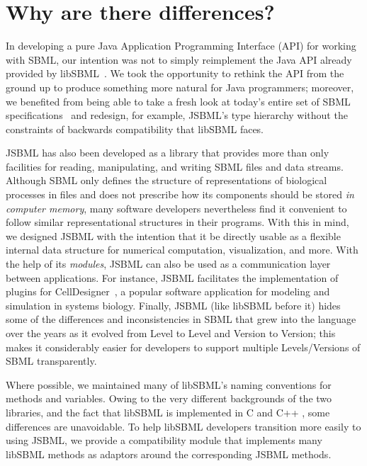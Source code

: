 
\section{Why are there differences?}
\label{sec:jsbml-design-goals}

In developing a pure Java Application Programming Interface (API) for
working with SBML, our intention was not to simply reimplement the Java API
already provided by libSBML~\citep{Bornstein2008}.
We took the opportunity to rethink the API
 from the ground up to
produce something more natural for Java programmers; moreover, we
benefited from being able to take a fresh look at today's entire set of
SBML specifications~\citep{Hucka2003, Hucka2008, Hucka2010a}
 and redesign, for example, JSBML's type
hierarchy without the constraints of backwards compatibility that libSBML
faces. 

JSBML has also been developed as a library that provides more than only
facilities for reading, manipulating, and writing SBML files and data
streams. Although SBML only defines the structure of representations of
biological processes in files and does not prescribe how its components
should be stored \emph{in computer memory}, many software developers
nevertheless find it convenient to follow similar representational
structures in their programs.  With this
in mind, we designed JSBML with the intention that it be directly usable as
a flexible internal data structure for numerical computation,
visualization, and more. With the help of its \emph{modules}, JSBML can
also be used as a communication layer between applications. For instance,
JSBML facilitates the implementation of plugins for
CellDesigner~\citep{Funahashi2003},  a popular software
application for modeling and simulation in systems biology. Finally, JSBML
(like libSBML before it) hides some of the differences and inconsistencies
in SBML  that grew into the language
over the years as it evolved from Level to Level and Version to Version;
this makes it considerably easier for developers to support multiple
Levels/Versions of SBML transparently.

Where possible, we maintained many of libSBML's naming conventions for
methods and variables. Owing to the very different backgrounds of the two
libraries, and the fact that libSBML is implemented in C  and
C++ , some differences are unavoidable. To help libSBML
developers transition more easily to using JSBML, we provide a
compatibility module that implements many libSBML methods as adaptors
around the corresponding JSBML methods.

